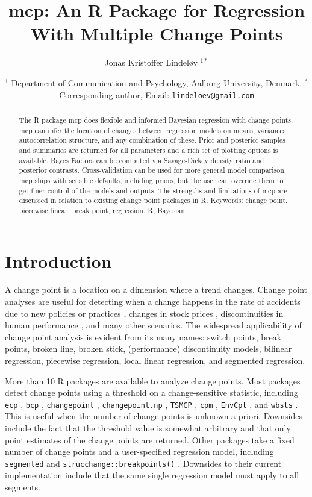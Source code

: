 \documentclass[
  american,
]{article}
\title{mcp: An R Package for Regression With Multiple Change Points}
\author{Jonas Kristoffer Lindeløv \(^{1*}\)}
\date{\(^1\) Department of Communication and Psychology, Aalborg University, Denmark.\break
\(^*\) Corresponding author, Email: \href{mailto:lindeloev@gmail.com}{\nolinkurl{lindeloev@gmail.com}}}
\begin{document}
\maketitle
\begin{abstract}
The R package mcp does flexible and informed Bayesian regression with change points. mcp can infer the location of changes between regression models on means, variances, autocorrelation structure, and any combination of these. Prior and posterior samples and summaries are returned for all parameters and a rich set of plotting options is available. Bayes Factors can be computed via Savage-Dickey density ratio and posterior contrasts. Cross-validation can be used for more general model comparison. mcp ships with sensible defaults, including priors, but the user can override them to get finer control of the models and outputs. The strengths and limitations of mcp are discussed in relation to existing change point packages in R.
\linebreak\linebreak
Keywords: change point, piecewise linear, break point, regression, R, Bayesian
\end{abstract}

\hypertarget{introduction}{%
\section{Introduction}\label{introduction}}

A change point is a location on a dimension where a trend changes. Change point analyses are useful for detecting when a change happens in the rate of accidents due to new policies or practices \citep{raftery1986}, changes in stock prices \citep{chen1997a}, discontinuities in human performance \citep{cowan2000}, and many other scenarios. The widespread applicability of change point analysis is evident from its many names: switch points, break points, broken line, broken stick, (performance) discontinuity models, bilinear regression, piecewise regression, local linear regression, and segmented regression.

More than 10 R packages are available to analyze change points. Most packages detect change points using a threshold on a change-sensitive statistic, including \texttt{ecp} \citep{james2015}, \texttt{bcp} \citep{erdman2007}, \texttt{changepoint} \citep{killick2014}, \texttt{changepoint.np} \citep{haynes2019}, \texttt{TSMCP} \citep{li2018}, \texttt{cpm} \citep{ross2015}, \texttt{EnvCpt} \citep{killick2018}, and \texttt{wbsts} \citep{korkas2018}. This is useful when the number of change points is unknown a priori. Downsides include the fact that the threshold value is somewhat arbitrary and that only point estimates of the change points are returned. Other packages take a fixed number of change points and a user-specified regression model, including \texttt{segmented} \citep{muggeo2008} and \texttt{strucchange::breakpoints()} \citep{zeileis2003}. Downsides to their current implementation include that the same single regression model must apply to all segments.
\end{document}
